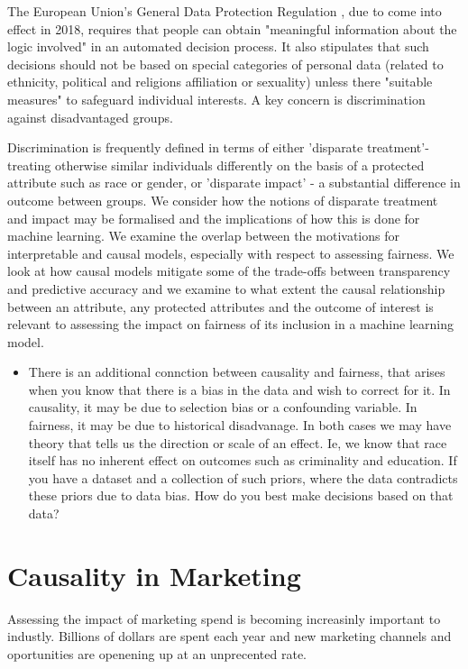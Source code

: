 \documentclass[11pt,a4paper,oneside]{book}
\begin{document}
The European Union’s General Data Protection Regulation \cite{XXXX}, due to come into effect in 2018, requires that people can obtain "meaningful information about the logic involved" in an automated decision process. It also stipulates that such decisions should not be based on special categories of personal data (related to ethnicity, political and religions affiliation or sexuality) unless there "suitable measures" to safeguard individual interests. A key concern is discrimination against disadvantaged groups. 

Discrimination is frequently defined in terms of either ’disparate treatment’- treating otherwise similar individuals differently on the basis of a protected attribute such as race or gender, or ’disparate impact’ - a substantial difference in outcome between groups. We consider how the notions of disparate treatment and impact may be formalised and the implications of how this is done for machine learning. We examine the overlap between the motivations for interpretable and causal models, especially with respect to assessing fairness. We look at how causal models mitigate some of the trade-offs between transparency and predictive accuracy and we examine to
what extent the causal relationship between an attribute, any protected attributes and the outcome of interest is relevant to assessing the impact on fairness of its inclusion in a machine learning model.


\begin{itemize}
\item There is an additional connction between causality and fairness, that arises when you know that there is a bias in the data and wish to correct for it. In causality, it may be due to selection bias or a confounding variable. In fairness, it may be due to historical disadvanage. In both cases we may have theory that tells us the direction or scale of an effect. Ie, we know that race itself has no inherent effect on outcomes such as criminality and education. If you have a dataset and a collection of such priors, where the data contradicts these priors due to data bias. How do you best make decisions based on that data? 
\end{itemize}

\chapter*{Causality in Marketing}
Assessing the impact of marketing spend is becoming increasinly important to industly. Billions of dollars \cite{XXX} are spent each year and new marketing channels and oportunities are openening up at an unprecented rate. 
\end{document}
